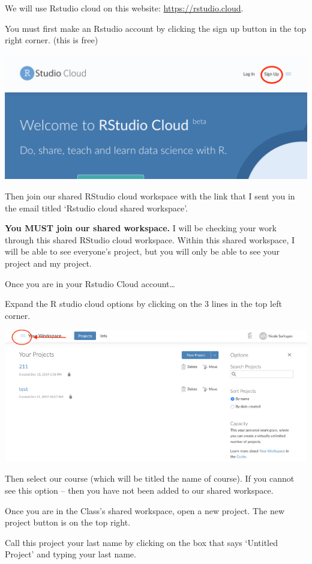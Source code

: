 \documentclass[
]{book}
\begin{document}
We will use Rstudio cloud on this website: \url{https://rstudio.cloud}.

You must first make an Rstudio account by clicking the sign up button in the top right corner. (this is free)

\includegraphics{img/signup.png}

Then join our shared RStudio cloud workspace with the link that I sent you in the email titled `Rstudio cloud shared workspace'.

\textbf{You MUST join our shared workspace.} I will be checking your work through this shared RStudio cloud workspace. Within this shared workspace, I will be able to see everyone's project, but you will only be able to see your project and my project.

Once you are in your Rstudio Cloud account\ldots{}

Expand the R studio cloud options by clicking on the 3 lines in the top left corner.

\includegraphics{img/Picture1.png}

Then select our course (which will be titled the name of course). If you cannot see this option -- then you have not been added to our shared workspace.

Once you are in the Class's shared workspace, open a new project. The new project button is on the top right.

Call this project your last name by clicking on the box that says `Untitled Project' and typing your last name.
\end{document}
